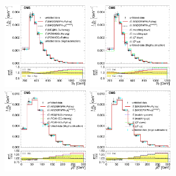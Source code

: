 \begin{figure}[hbtp]
     \includegraphics[width=0.33\textwidth]{Chapters/04_Analysis/04b_XSections/images/results/fit/8TeV/ST/central/normalised_xsection_combined_different_generators_with_bkgd_subtraction_results.pdf}\hfill
     \includegraphics[width=0.33\textwidth]{Chapters/04_Analysis/04b_XSections/images/results/fit/8TeV/ST/central/normalised_xsection_combined_systematics_shifts_with_bkgd_subtraction_results.pdf}\\
     \includegraphics[width=0.33\textwidth]{Chapters/04_Analysis/04b_XSections/images/results/fit/8TeV/WPT/central/normalised_xsection_combined_different_generators_with_bkgd_subtraction_results.pdf}\hfill
     \includegraphics[width=0.33\textwidth]{Chapters/04_Analysis/04b_XSections/images/results/fit/8TeV/WPT/central/normalised_xsection_combined_systematics_shifts_with_bkgd_subtraction_results.pdf}\hfill

\end{figure}
